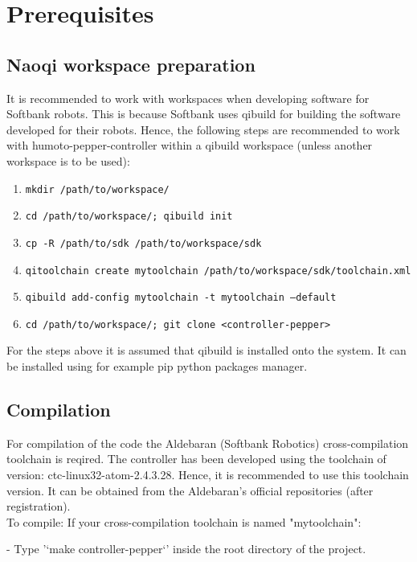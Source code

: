 \section{Prerequisites}

\subsection{Naoqi workspace preparation}
\noindent It is recommended to work with workspaces when developing software for Softbank robots. This is because
Softbank uses qibuild for building the software developed for their robots. Hence, the following steps are recommended
to work with humoto-pepper-controller within a qibuild workspace (unless another workspace is to be used):

\begin{enumerate}
\item \texttt{mkdir /path/to/workspace/}
\item \texttt{cd /path/to/workspace/; qibuild init}
\item \texttt{cp -R /path/to/sdk /path/to/workspace/sdk}
\item \texttt{qitoolchain create mytoolchain /path/to/workspace/sdk/toolchain.xml}
\item \texttt{qibuild add-config mytoolchain -t mytoolchain --default}
\item \texttt{cd /path/to/workspace/; git clone <controller-pepper>}
\end{enumerate}

\noindent For the steps above it is assumed that qibuild is installed onto the system. It can be installed using for example pip
python packages manager.

\subsection{Compilation}
\noindent For compilation of the code the Aldebaran (Softbank Robotics) cross-compilation toolchain is reqired. The
controller has been developed using the toolchain of version: ctc-linux32-atom-2.4.3.28. Hence, it is recommended to use
this toolchain version. It can be obtained from the Aldebaran's official repositories (after registration).\\

\noindent To compile:
\noindent If your cross-compilation toolchain is named "mytoolchain":

- Type '`make controller-pepper`' inside the root directory of the project.

